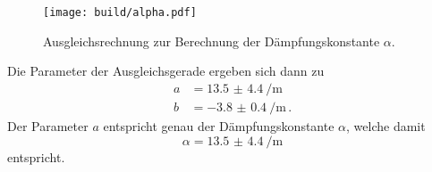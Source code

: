 \begin{figure}
    \centering
    \texttt{[image: build/alpha.pdf]}
    \caption{Ausgleichsrechnung zur Berechnung der Dämpfungskonstante $\alpha$.}
    \label{fig:alpha}
\end{figure}

Die Parameter der Ausgleichsgerade ergeben sich dann zu 
\begin{align}
    a &= \SI{13.5(44)}{\per\metre} \\
    b &= \SI{-3.8(04)}{\per\metre}\,.
\end{align}
Der Parameter $a$ entspricht genau der Dämpfungskonstante $\alpha$, welche damit 
\begin{equation}
    \alpha = \SI{13.5(44)}{\per\m}
\end{equation}
entspricht. 

